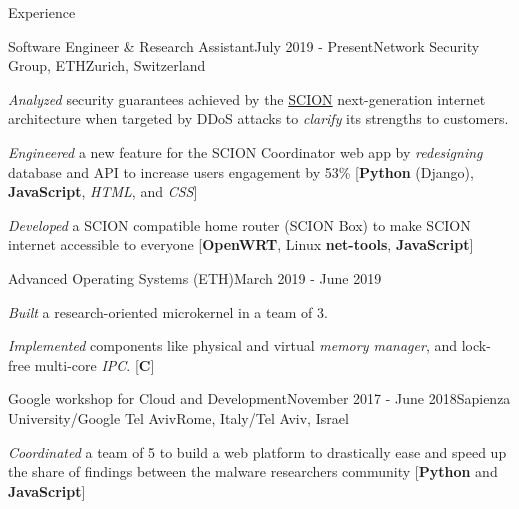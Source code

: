 \documentclass{resume}
\begin{document}
\begin{rSection}{Experience}

  \begin{rSubsection}{Software Engineer \& Research Assistant}{July 2019 - Present}{Network Security Group, ETH}{Zurich, Switzerland}
  \item \textit{Analyzed} security guarantees achieved by the \href{https://www.scion-architecture.net/}{SCION} next-generation internet architecture when targeted by DDoS attacks to \textit{clarify} its strengths to customers.
  \item \textit{Engineered} a new feature for the SCION Coordinator web app by \textit{redesigning} database and API to increase users engagement by 53\% [\textbf{Python} (Django), \textbf{JavaScript}, \textit{HTML}, and \textit{CSS}]
  \item \textit{Developed} a SCION compatible home router (SCION Box) to make SCION internet accessible to everyone [\textbf{OpenWRT}, Linux \textbf{net-tools}, \textbf{JavaScript}]
  \end{rSubsection}
  \begin{rSubsection}{Advanced Operating Systems (ETH)}{March 2019 - June 2019}{}{}
  \item \textit{Built} a research-oriented microkernel in a team of 3.
  \item \textit{Implemented} components like physical and virtual \textit{memory manager}, and lock-free multi-core \textit{IPC}. [\textbf{C}]
  \end{rSubsection}
  \begin{rSubsection}{Google workshop for Cloud and Development}{November 2017 - June 2018}{Sapienza University/Google Tel Aviv}{Rome, Italy/Tel Aviv, Israel}
  \item \textit{Coordinated} a team of 5 to build a web platform to drastically ease and speed up the share of findings between the malware researchers community [\textbf{Python} and \textbf{JavaScript}]
  \end{rSubsection}

\end{rSection}

\end{document}
